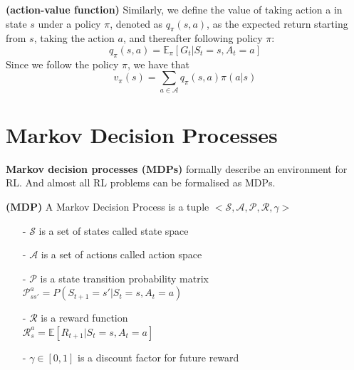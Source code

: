 \begin{definition} {\rm\bf (action-value function)}
Similarly, we define the value of taking action a in state $s$ under a policy $\pi$, 
denoted as $q_\pi(s,a)$, as the expected return starting from $s$, taking the 
action $a$, and thereafter following policy $\pi$:
\begin{equation}
q_\pi(s,a)=\mathbb{E}_\pi[G_t|S_t=s,A_t=a]
\end{equation}
Since we follow the policy $\pi$, we have that
\begin{equation}
v_\pi(s)=\sum_{a\in\mathcal{A}}q_\pi(s,a)\pi(a|s)
\end{equation}
\end{definition}



\section{Markov Decision Processes}

{\bf Markov decision processes (MDPs)} formally describe an environment for RL. 
And almost all RL problems can be formalised as MDPs.

\begin{definition} {\rm\bf (MDP)}
A Markov Decision Process is a tuple $<\mathcal{S}, \mathcal{A}, \mathcal{P}, 
\mathcal{R}, \gamma>$
\begin{itemize}
\setlength{\parskip}{0pt}
\item[-]
$\mathcal{S}$ is a set of states called state space

\item[-]
$\mathcal{A}$ is a set of actions called action space

\item[-]
$\mathcal{P}$ is a state transition probability matrix \\
$\mathcal{P}^a_{ss'}=P(S_{t+1}=s'|S_t=s,A_t=a)$

\item[-]
$\mathcal{R}$ is a reward function \\
$ \mathcal{R}^a_s=\mathbb{E}\left[R_{t+1}|S_t=s,A_t=a\right]$

\item[-]
$\gamma\in[0, 1]$ is a discount factor for future reward

\end{itemize}
\end{definition}


